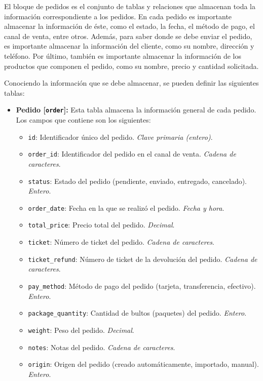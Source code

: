 El bloque de pedidos es el conjunto de tablas y relaciones que almacenan toda la información correspondiente a los pedidos. En cada pedido es importante almacenar la información de éste, como el estado, la fecha, el método de pago, el canal de venta, entre otros. Además, para saber donde se debe enviar el pedido, es importante almacenar la información del cliente, como su nombre, dirección y teléfono. Por último, también es importante almacenar la información de los productos que componen el pedido, como su nombre, precio y cantidad solicitada.

Conociendo la información que se debe almacenar, se pueden definir las siguientes tablas:

\begin{itemize}
    \item \textbf{Pedido [\texttt{order}]:} Esta tabla almacena la información general de cada pedido. Los campos que contiene son los siguientes:
          \begin{itemize}
              \item \texttt{id}: Identificador único del pedido. \textit{Clave primaria (entero)}.
              \item \texttt{order\_id}: Identificador del pedido en el canal de venta. \textit{Cadena de caracteres}.
              \item \texttt{status}: Estado del pedido (pendiente, enviado, entregado, cancelado). \textit{Entero}.
              \item \texttt{order\_date}: Fecha en la que se realizó el pedido. \textit{Fecha y hora}.
              \item \texttt{total\_price}: Precio total del pedido. \textit{Decimal}.
              \item \texttt{ticket}: Número de ticket del pedido. \textit{Cadena de caracteres}.
              \item \texttt{ticket\_refund}: Número de ticket de la devolución del pedido. \textit{Cadena de caracteres}.
              \item \texttt{pay\_method}: Método de pago del pedido (tarjeta, transferencia, efectivo). \textit{Entero}.
              \item \texttt{package\_quantity}: Cantidad de bultos (paquetes) del pedido. \textit{Entero}.
              \item \texttt{weight}: Peso del pedido. \textit{Decimal}.
              \item \texttt{notes}: Notas del pedido. \textit{Cadena de caracteres}.
              \item \texttt{origin}: Origen del pedido (creado automáticamente, importado, manual). \textit{Entero}.

\end{itemize}
\end{itemize}
